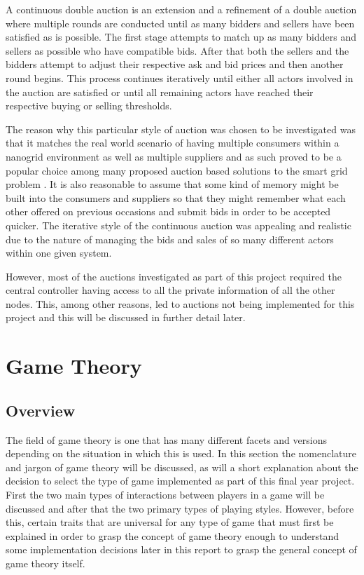 \documentclass[a4paper, notitlepage]{report}
\begin{document}
A continuous double auction is an extension and a refinement of a double auction
where multiple rounds are conducted until as many bidders and sellers have been
satisfied as is possible. The first stage attempts to match up as many bidders
and sellers as possible who have compatible bids. After that both the sellers
and the bidders attempt to adjust their respective ask and bid prices and then
another round begins. This process continues iteratively until either all actors
involved in the auction are satisfied or until all remaining actors have reached
their respective buying or selling thresholds. 

The reason why this particular style of auction was chosen to be investigated
was that it matches the real world scenario of having multiple consumers within
a nanogrid environment as well as multiple suppliers and as such proved to be a
popular choice among many proposed auction based solutions to the smart grid
problem \cite{ramachandran2011intelligent}. It is also reasonable to
assume that some kind of memory might be built into the consumers and suppliers
so that they might remember what each other offered on previous occasions and
submit bids in order to be accepted quicker. The iterative style of the
continuous auction was appealing and realistic due to the nature of managing the
bids and sales of so many different actors within one given system.

However, most of the auctions investigated as part of this project required the central
controller having access to all the private information of all the other nodes.
This, among other reasons, led to auctions not being implemented for this
project and this will be discussed in further detail later.
\chapter{Game Theory}
\label{sec:org7391022}
\section{Overview}
\label{sec:org23d17e2}
The field of game theory is one that has many different facets and versions
depending on the situation in which this is used. In this section the
nomenclature and jargon of game theory will be discussed, as will a short
explanation about the decision to select the type of game implemented as part of
this final year project. First the two main types of interactions between
players in a game will be discussed and after that the two primary types of
playing styles. However, before this, certain traits that are universal for any
type of game that must first be explained in order to grasp the concept of game
theory enough to understand some implementation decisions later in this report
to grasp the general concept of game theory itself.
\end{document}
